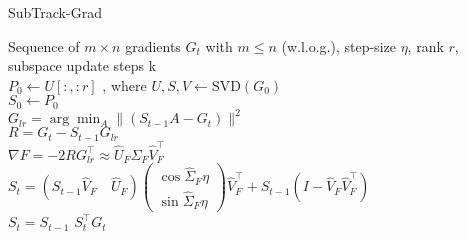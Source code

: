 \begin{algorithm}[t]
\caption{SubTrack-Grad}
\label{alg:SubTrack}
\begin{algorithmic}
\small
\REQUIRE Sequence of $m \times n$ gradients $G_t$ with $m \leq n$ (w.l.o.g.), step-size $\eta$, rank $r$, subspace update steps k
 \\
    $P_0 \gets U[:, :r]$ , where $U, S, V \gets \text{SVD}(G_0)$ \\
    $S_0 \gets P_0$ 
         \\ 
        $G_{lr} = \arg \min_A \| (S_{t-1} A - G_t) \|^2$  \\ 
        $R = G_t - S_{t-1}G_{lr}$ \\
        $\nabla F = -2RG_{lr}^\top \approx \widehat{U}_F\widehat{\Sigma}_F\widehat{V}^\top_F$ \\
        $
        S_t = (S_{t-1}\widehat{V}_F \quad \widehat{U}_F) \begin{pmatrix} \cos{\widehat{\Sigma}_F \eta} \\ \sin{\widehat{\Sigma}_F \eta} \end{pmatrix} \widehat{V}^\top_F + S_{t-1}(I - \widehat{V}_F\widehat{V}^\top_F)
        $ \\
    \ELSE
         $S_t = S_{t-1}$
    \ENDIF
     $S_t^{\top} G_t$
\ENDFOR
\end{algorithmic}
\end{algorithm}